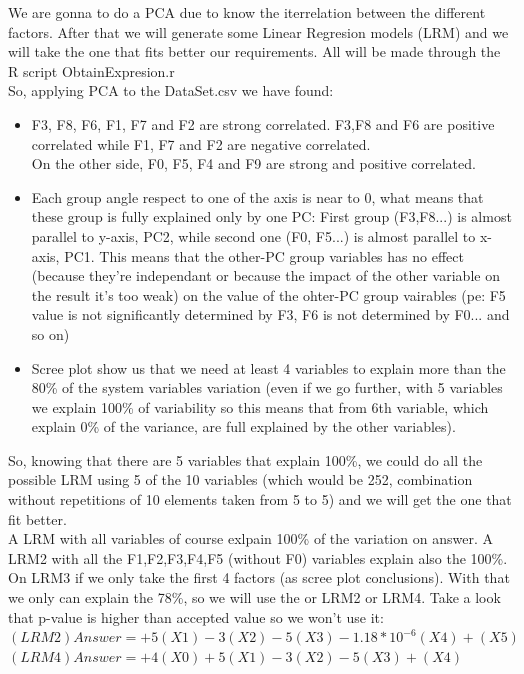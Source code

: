 \documentclass[12pt]{article}
\begin{document}
We are gonna to do a PCA due to know the iterrelation between the different factors. After that we will generate some Linear Regresion models (LRM) and we will take the one that fits better our requirements. All will be made through the R script ObtainExpresion.r\\
So, applying PCA to the DataSet.csv we have found:
\begin{itemize}
\item F3, F8, F6, F1, F7 and F2 are strong correlated. F3,F8 and F6 are positive correlated while F1, F7 and F2 are negative correlated.\\ On the other side, F0, F5, F4 and F9 are strong and positive correlated.
\item Each group angle respect to one of the axis is near to 0, what means that these group is fully explained only by one PC: First group (F3,F8...) is almost parallel to y-axis, PC2, while second one (F0, F5...) is almost parallel to x-axis, PC1. 
This means that the other-PC group variables has no effect (because they're independant or because the impact of the other variable on the result it's too weak) on the value of the ohter-PC group vairables (pe: F5 value is not significantly determined by F3, F6 is not determined by F0... and so on)
\item Scree plot show us that we need at least 4 variables to explain more than the 80\% of the system variables variation (even if we go further, with 5 variables we explain 100\% of variability so this means that from 6th variable, which explain 0\% of the variance, are full explained by the other variables).
\end{itemize}
So, knowing that there are 5 variables that explain 100\%, we could do all the possible LRM using 5 of the 10 variables (which would be 252, combination without repetitions of 10 elements taken from 5 to 5) and we will get the one that fit better. \\

A LRM with all variables of course exlpain 100\% of the variation on answer.
A LRM2 with all the F1,F2,F3,F4,F5 (without F0) variables explain also the 100\%.
On LRM3 if we only take the first 4 factors (as scree plot conclusions). With that we only can explain the 78\%, so we will use the or LRM2 or LRM4. Take a look that p-value is higher than accepted value so we won't use it:\\
$(LRM2) Answer = +5(X1)-3(X2)-5(X3)-1.18*10^{-6}(X4)+(X5)$\\
$(LRM4) Answer = +4(X0)+5(X1)-3(X2)-5(X3)+(X4)$\\
\end{document}
